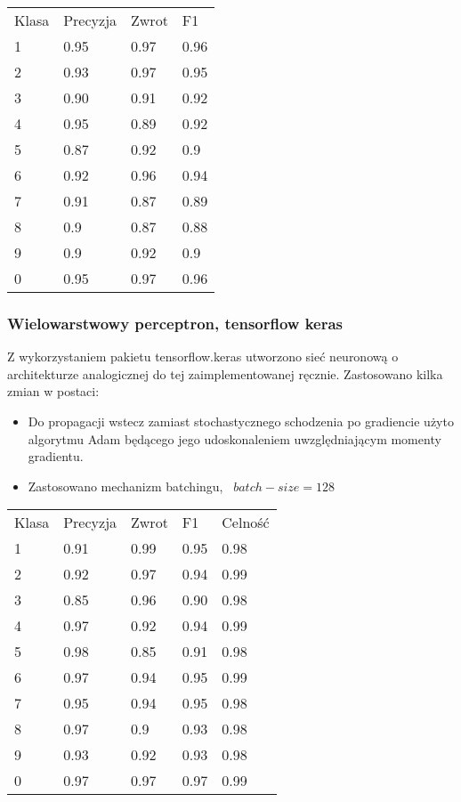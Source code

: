 \documentclass{article}
\begin{document}
\begin{table}[]
\begin{tabular}{llll}
Klasa & Precyzja & Zwrot & F1   \\
1     & 0.95     & 0.97  & 0.96 \\
2     & 0.93     & 0.97  & 0.95 \\
3     & 0.90     & 0.91  & 0.92 \\
4     & 0.95     & 0.89  & 0.92 \\
5     & 0.87     & 0.92  & 0.9  \\
6     & 0.92     & 0.96  & 0.94 \\
7     & 0.91     & 0.87  & 0.89 \\
8     & 0.9      & 0.87  & 0.88 \\
9     & 0.9      & 0.92  & 0.9  \\
0     & 0.95     & 0.97  & 0.96  
\end{tabular}
\end{table}



\subsubsection{Wielowarstwowy perceptron, tensorflow keras}

Z wykorzystaniem pakietu tensorflow.keras utworzono sieć neuronową o architekturze analogicznej do tej zaimplementowanej ręcznie. Zastosowano kilka zmian w postaci:

\begin{itemize}
\item Do propagacji wstecz zamiast stochastycznego schodzenia po gradiencie użyto algorytmu Adam będącego jego udoskonaleniem uwzględniającym momenty gradientu.

\item Zastosowano mechanizm batchingu, ~$batch-size = 128$

\end{itemize}

\begin{table}[]
\begin{tabular}{lllll}
Klasa & Precyzja & Zwrot & F1   & Celność \\
1     & 0.91     & 0.99  & 0.95 & 0.98    \\
2     & 0.92     & 0.97  & 0.94 & 0.99    \\
3     & 0.85     & 0.96  & 0.90 & 0.98    \\
4     & 0.97     & 0.92  & 0.94 & 0.99    \\
5     & 0.98     & 0.85  & 0.91 & 0.98    \\
6     & 0.97     & 0.94  & 0.95 & 0.99    \\
7     & 0.95     & 0.94  & 0.95 & 0.98    \\
8     & 0.97     & 0.9   & 0.93 & 0.98    \\
9     & 0.93     & 0.92  & 0.93 & 0.98    \\
0     & 0.97     & 0.97  & 0.97 & 0.99   
\end{tabular}
\end{table}
\end{document}
